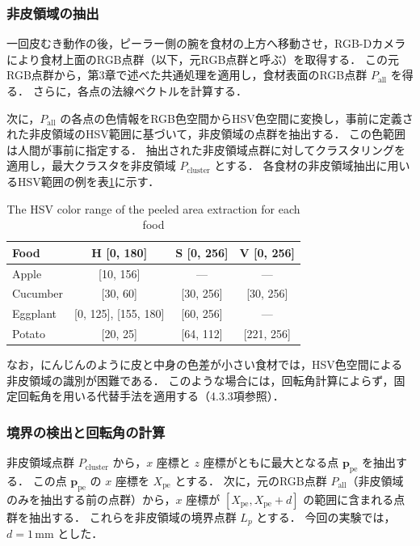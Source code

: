 \subsubsection{非皮領域の抽出}

一回皮むき動作の後，ピーラー側の腕を食材の上方へ移動させ，RGB-Dカメラにより食材上面のRGB点群（以下，元RGB点群と呼ぶ）を取得する．
この元RGB点群から，第3章で述べた共通処理を適用し，食材表面のRGB点群 $P_{\mathrm{all}}$ を得る．
さらに，各点の法線ベクトルを計算する．

次に，$P_{\mathrm{all}}$ の各点の色情報をRGB色空間からHSV色空間に変換し，事前に定義された非皮領域のHSV範囲に基づいて，非皮領域の点群を抽出する．
この色範囲は人間が事前に指定する．
抽出された非皮領域点群に対してクラスタリングを適用し，最大クラスタを非皮領域 $P_{\mathrm{cluster}}$ とする．
各食材の非皮領域抽出に用いるHSV範囲の例を表\ref{tab:peeling_hsv_range}に示す．

\begin{table}[ht]
  \centering
  \caption{The HSV color range of the peeled area extraction for each food}
  \label{tab:peeling_hsv_range}
  \begin{tabular}{@{}lccc@{}}
    \toprule
    Food & H [0, 180] & S [0, 256] & V [0, 256] \\
    \midrule
    Apple & [10, 156] & --- & --- \\
    Cucumber & [30, 60] & [30, 256] & [30, 256] \\
    Eggplant & [0, 125], [155, 180] & [60, 256] & --- \\
    Potato & [20, 25] & [64, 112] & [221, 256] \\
    \bottomrule
  \end{tabular}
\end{table}

なお，にんじんのように皮と中身の色差が小さい食材では，HSV色空間による非皮領域の識別が困難である．
このような場合には，回転角計算によらず，固定回転角を用いる代替手法を適用する（4.3.3項参照）．

\subsubsection{境界の検出と回転角の計算}

非皮領域点群 $P_{\mathrm{cluster}}$ から，$x$ 座標と $z$ 座標がともに最大となる点 $\mathbf{p}_{\mathrm{pe}}$ を抽出する．
この点 $\mathbf{p}_{\mathrm{pe}}$ の $x$ 座標を $X_{\mathrm{pe}}$ とする．
次に，{元のRGB点群 $P_{\mathrm{all}}$}（非皮領域のみを抽出する前の点群）から，$x$ 座標が $[X_{\mathrm{pe}}, X_{\mathrm{pe}} + d]$ の範囲に含まれる点群を抽出する．
これらを非皮領域の境界点群 $L_p$ とする．
今回の実験では，$d = 1$\,mm とした．

